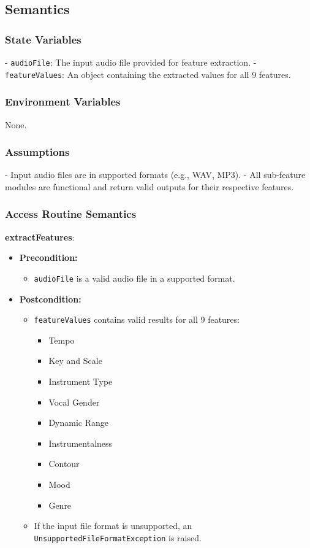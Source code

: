 \documentclass[12pt, titlepage]{article}
\begin{document}
\subsection{Semantics}

\subsubsection{State Variables}
- \texttt{audioFile}: The input audio file provided for feature extraction.
- \texttt{featureValues}: An object containing the extracted values for all 9 features.

\subsubsection{Environment Variables}
None.

\subsubsection{Assumptions}
- Input audio files are in supported formats (e.g., WAV, MP3).
- All sub-feature modules are functional and return valid outputs for their respective features.

\subsubsection{Access Routine Semantics}
\textbf{extractFeatures}:
\begin{itemize}
    \item \textbf{Precondition:} 
    \begin{itemize}
        \item \texttt{audioFile} is a valid audio file in a supported format.
    \end{itemize}
    \item \textbf{Postcondition:}
    \begin{itemize}
        \item \texttt{featureValues} contains valid results for all 9 features:
            \begin{itemize}
                \item Tempo
                \item Key and Scale
                \item Instrument Type
                \item Vocal Gender
                \item Dynamic Range
                \item Instrumentalness
                \item Contour
                \item Mood
                \item Genre
            \end{itemize}
        \item If the input file format is unsupported, an \texttt{UnsupportedFileFormatException} is raised.
    \end{itemize}
\end{itemize}
\end{document}
